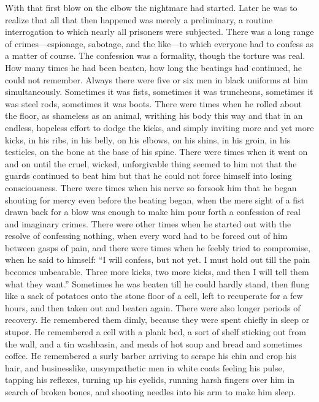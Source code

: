 With that first blow on the elbow the nightmare had started. Later he
was to realize that all that then happened was merely a preliminary, a
routine interrogation to which nearly all prisoners were subjected.
There was a long range of crimes---espionage, sabotage, and the
like---to which everyone had to confess as a matter of course. The
confession was a formality, though the torture was real. How many times
he had been beaten, how long the beatings had continued, he could not
remember. Always there were five or six men in black uniforms at him
simultaneously. Sometimes it was fists, sometimes it was truncheons,
sometimes it was steel rods, sometimes it was boots. There were times
when he rolled about the floor, as shameless as an animal, writhing his
body this way and that in an endless, hopeless effort to dodge the
kicks, and simply inviting more and yet more kicks, in his ribs, in his
belly, on his elbows, on his shins, in his groin, in his testicles, on
the bone at the base of his spine. There were times when it went on and
on until the cruel, wicked, unforgivable thing seemed to him not that
the guards continued to beat him but that he could not force himself
into losing consciousness. There were times when his nerve so forsook
him that he began shouting for mercy even before the beating began, when
the mere sight of a fist drawn back for a blow was enough to make him
pour forth a confession of real and imaginary crimes. There were other
times when he started out with the resolve of confessing nothing, when
every word had to be forced out of him between gasps of pain, and there
were times when he feebly tried to compromise, when he said to himself:
``I will confess, but not yet. I must hold out till the pain becomes
unbearable. Three more kicks, two more kicks, and then I will tell them
what they want.'' Sometimes he was beaten till he could hardly stand,
then flung like a sack of potatoes onto the stone floor of a cell, left
to recuperate for a few hours, and then taken out and beaten again.
There were also longer periods of recovery. He remembered them dimly,
because they were spent chiefly in sleep or stupor. He remembered a cell
with a plank bed, a sort of shelf sticking out from the wall, and a tin
washbasin, and meals of hot soup and bread and sometimes coffee. He
remembered a surly barber arriving to scrape his chin and crop his hair,
and businesslike, unsympathetic men in white coats feeling his pulse,
tapping his reflexes, turning up his eyelids, running harsh fingers over
him in search of broken bones, and shooting needles into his arm to make
him sleep.

